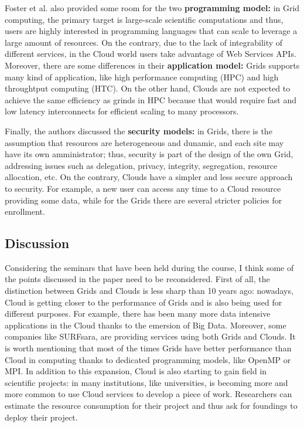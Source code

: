 \documentclass[a4paper]{IEEEtran}
\begin{document}
Foster et al. also provided some room for the two \textbf{programming model:} in Grid computing, the primary target is large-scale scientific computations and thus, users are highly interested in programming languages that can scale to leverage a large amount of resources. On the contrary, due to the lack of integrability of different services, in the Cloud world users take advantage of Web Services APIs.
Moreover, there are some differences in their \textbf{application model:} Grids supports many kind of application, like high performance computing (HPC) and high throughtput computing (HTC). On the other hand, Clouds are not expected to achieve the same efficiency as grinds in HPC because that would require fast and low latency interconnects for efficient scaling to many processors.

Finally, the authors discussed the \textbf{security models:} in Grids, there is the assumption that resources are heterogeneous and dunamic, and each site may have its own amministrator; thus, security is part of the design of the own Grid, addressing issues such as delegation, privacy, integrity, segregation, resource allocation, etc. On the contrary, Clouds have a simpler and less secure approach to security. For example, a new user can access any time to a Cloud resource providing some data, while for the Grids there are several stricter policies for enrollment.

\subsection{Discussion}

Considering the seminars that have been held during the course, I think some of the points discussed in the paper need to be reconsidered. First of all, the distinction between Grids and Clouds is less sharp than 10 years ago: nowadays, Cloud is getting closer to the performance of Grids and is also being used for different purposes. For example, there has been many more data intensive applications in the Cloud thanks to the emersion of Big Data. Moreover, some companies like SURFsara, are providing services using both Grids and Clouds. It is worth mentioning that most of the times Grids have better performance than Cloud in computing thanks to dedicated programming models, like OpenMP or MPI.
In addition to this expansion, Cloud is also starting to gain field in scientific projects: in many institutions, like universities, is becoming more and more common to use Cloud services to develop a piece of work. Researchers can estimate the resource consumption for their project and thus ask for foundings to deploy their project.
\end{document}
